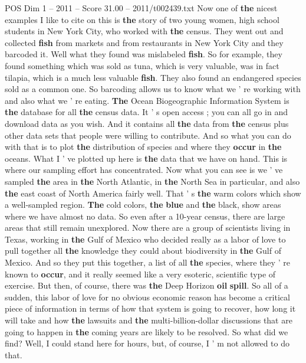 \begin{textsample}{POS Dim 1 – 2011 – Score 31.00 – 2011/t002439.txt}
Now one of \textbf{the} nicest examples I like to cite on this is \textbf{the} story of two young women, high school students in New York City, who worked with \textbf{the} census.
They went out and collected \textbf{fish} from markets and from restaurants in New York City and they barcoded it.
Well what they found was mislabeled \textbf{fish}.
So for example, they found something which was sold as tuna, which is very valuable, was in fact tilapia, which is a much less valuable \textbf{fish}.
They also found an endangered species sold as a common one.
So barcoding allows us to know what we ' re working with and also what we ' re eating. \textbf{The} Ocean Biogeographic Information System is \textbf{the} database for all \textbf{the} census data.
It ' s open access ; you can all go in and download data as you wish.
And it contains all \textbf{the} data from \textbf{the} census plus other data sets that people were willing to contribute.
And so what you can do with that is to plot \textbf{the} distribution of species and where they \textbf{occur} in \textbf{the} oceans.
What I ' ve plotted up here is \textbf{the} data that we have on hand.
This is where our sampling effort has concentrated.
Now what you can see is we ' ve sampled \textbf{the} area in \textbf{the} North Atlantic, in \textbf{the} North Sea in particular, and also \textbf{the} east coast of North America fairly well.
That ' s \textbf{the} warm colors which show a well-sampled region. \textbf{The} cold colors, \textbf{the} \textbf{blue} and \textbf{the} black, show areas where we have almost no data.
So even after a 10-year census, there are large areas that still remain unexplored.
Now there are a group of scientists living in Texas, working in \textbf{the} Gulf of Mexico who decided really as a labor of love to pull together all \textbf{the} knowledge they could about biodiversity in \textbf{the} Gulf of Mexico.
And so they put this together, a list of all \textbf{the} species, where they ' re known to \textbf{occur}, and it really seemed like a very esoteric, scientific type of exercise.
But then, of course, there was \textbf{the} Deep Horizon \textbf{oil} \textbf{spill}.
So all of a sudden, this labor of love for no obvious economic reason has become a critical piece of information in terms of how that system is going to recover, how long it will take and how \textbf{the} lawsuits and \textbf{the} multi-billion-dollar discussions that are going to happen in \textbf{the} coming years are likely to be resolved.
So what did we find?
Well, I could stand here for hours, but, of course, I ' m not allowed to do that.

\end{textsample}
